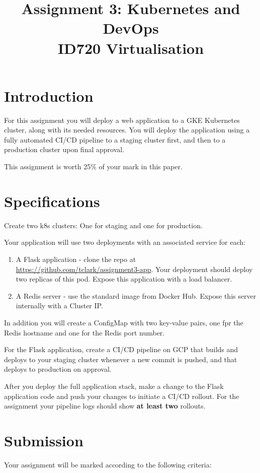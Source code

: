 \documentclass{article}
\begin{document}
\title{Assignment 3: Kubernetes and DevOps \\ ID720 Virtualisation}
\date{}
\maketitle

\section*{Introduction}
For this assignment you will deploy a web application to a GKE Kubernetes cluster, along with its needed resources. You will deploy the application using a fully automated CI/CD pipeline to a staging cluster first, and then to a production cluster upon final approval.

This assignment is worth 25\% of your mark in this paper.

\section{Specifications}

Create two k8s clusters: One for staging and one for production.

Your application will use two deployments with an associated service for each:
  \begin{enumerate}
    \item A Flask application - clone the repo at \url{https://github.com/tclark/assignment3-app}. Your deployment should deploy two replicas of this pod. Expose this application with a load balancer.
    \item A Redis server - use the standard image from Docker Hub. Expose this server internally with a Cluster IP.
  \end{enumerate}
    
In addition you will create a ConfigMap with two key-value pairs, one fpr the Redis hostname and one for the Redis port number. 

For the Flask application, create a CI/CD pipeline on GCP that builds and deploys to your staging cluster whenever a new commit is pushed, and that deploys to production on approval.

After you deploy the full application stack, make a change to the Flask application code and push your changes to initiate a CI/CD rollout. For the assignment your pipeline logs should show \textbf{at least two} rollouts. 

\section{Submission}
Your assignment will be marked according to the following criteria:
\end{document}
